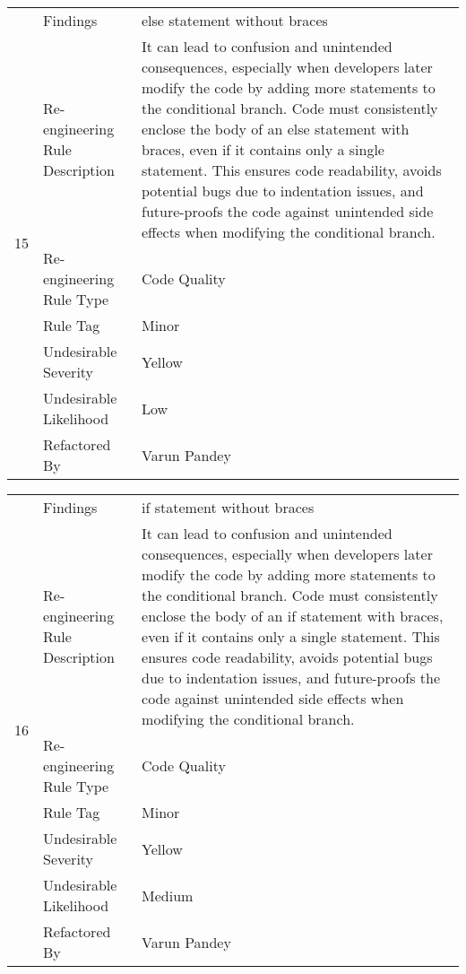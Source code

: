\documentclass[12pt,english]{article}
\begin{document}
\begin{table}[!ht]
    \begin{tabularx}{\textwidth}{|c|l|X|}
    \hline
        \multirow{7}{*}{15} & Findings & else statement without braces \\ \cline{2-3}
        & Re-engineering Rule Description &  It can lead to confusion and unintended consequences, especially when developers later modify the code by adding more statements to the conditional branch. Code must consistently enclose the body of an else statement with braces, even if it contains only a single statement. This ensures code readability, avoids potential bugs due to indentation issues, and future-proofs the code against unintended side effects when modifying the conditional branch.  \\ \cline{2-3}
        & Re-engineering Rule Type & Code Quality \\ \cline{2-3}
        & Rule Tag & Minor \\ \cline{2-3}
        & Undesirable Severity & Yellow \\ \cline{2-3}
        & Undesirable Likelihood & Low \\ \cline{2-3}
        & Refactored By & Varun Pandey \\ \hline
    \end{tabularx}
\end{table}

\begin{table}[!ht]
    \begin{tabularx}{\textwidth}{|c|l|X|}
    \hline
        \multirow{7}{*}{16} & Findings & if statement without braces \\ \cline{2-3}
        & Re-engineering Rule Description & It can lead to confusion and unintended consequences, especially when developers later modify the code by adding more statements to the conditional branch. Code must consistently enclose the body of an if statement with braces, even if it contains only a single statement. This ensures code readability, avoids potential bugs due to indentation issues, and future-proofs the code against unintended side effects when modifying the conditional branch.  \\ \cline{2-3}
        & Re-engineering Rule Type & Code Quality \\ \cline{2-3}
        & Rule Tag & Minor \\ \cline{2-3}
        & Undesirable Severity & Yellow \\ \cline{2-3}
        & Undesirable Likelihood & Medium \\ \cline{2-3}
        & Refactored By & Varun Pandey \\ \hline
    \end{tabularx}
\end{table}
\end{document}
